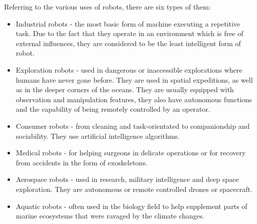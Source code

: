 \documentclass[runningheads,a4paper,12pt]{report}
\begin{document}
Referring to the various uses of robots, there are six types of them:
\begin{itemize}
\item Industrial robots - the most basic form of machine executing a repetitive task. Due to the fact that they operate in an environment which is free of external influences, they are considered to be the least intelligent form of robot. 
\item Exploration robots - used in dangerous or inaccessible explorations where humans have never gone before. They are used in spatial expeditions, as well as in the deeper corners of the oceans. They are usually equipped with observation and manipulation features, they also have autonomous functions and the capability of being remotely controlled by an operator. 
\item Consumer robots - from cleaning and task-orientated to companionship and sociability. They use artificial intelligence algorithms. 
\item Medical robots - for helping surgeons in delicate operations or for recovery from accidents in the form of exoskeletons. 
\item Aerospace robots - used in research, military intelligence and deep space exploration. They are autonomous or remote controlled drones or spacecraft.
\item Aquatic robots - often used in the biology field to help supplement parts of marine ecosystems that were ravaged by the climate changes.
\end{itemize}
\end{document}
